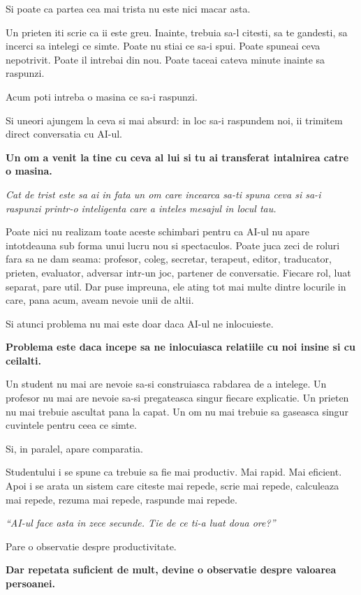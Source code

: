 Si poate ca partea cea mai trista nu este nici macar asta.

Un prieten iti scrie ca ii este greu. Inainte, trebuia sa-l citesti, sa
te gandesti, sa incerci sa intelegi ce simte. Poate nu stiai ce sa-i
spui. Poate spuneai ceva nepotrivit. Poate il intrebai din nou. Poate
taceai cateva minute inainte sa raspunzi.

Acum poti intreba o masina ce sa-i raspunzi.

Si uneori ajungem la ceva si mai absurd: in loc sa-i raspundem noi, ii
trimitem direct conversatia cu AI-ul.

\textbf{Un om a venit la tine cu ceva al lui si tu ai transferat
intalnirea catre o masina.}

\textit{Cat de trist este sa ai in fata un om care incearca sa-ti spuna
ceva si sa-i raspunzi printr-o inteligenta care a inteles mesajul in
locul tau.}

Poate nici nu realizam toate aceste schimbari pentru ca AI-ul nu apare
intotdeauna sub forma unui lucru nou si spectaculos. Poate juca zeci de
roluri fara sa ne dam seama: profesor, coleg, secretar, terapeut,
editor, traducator, prieten, evaluator, adversar intr-un joc, partener
de conversatie. Fiecare rol, luat separat, pare util. Dar puse impreuna,
ele ating tot mai multe dintre locurile in care, pana acum, aveam nevoie
unii de altii.

Si atunci problema nu mai este doar daca AI-ul ne inlocuieste.

\textbf{Problema este daca incepe sa ne inlocuiasca relatiile cu noi
insine si cu ceilalti.}

Un student nu mai are nevoie sa-si construiasca rabdarea de a intelege.
Un profesor nu mai are nevoie sa-si pregateasca singur fiecare
explicatie. Un prieten nu mai trebuie ascultat pana la capat. Un om nu
mai trebuie sa gaseasca singur cuvintele pentru ceea ce simte.

Si, in paralel, apare comparatia.

Studentului i se spune ca trebuie sa fie mai productiv. Mai rapid. Mai
eficient. Apoi i se arata un sistem care citeste mai repede, scrie mai
repede, calculeaza mai repede, rezuma mai repede, raspunde mai repede.

\textit{``AI-ul face asta in zece secunde. Tie de ce ti-a luat doua
ore?''}

Pare o observatie despre productivitate.

\textbf{Dar repetata suficient de mult, devine o observatie despre
valoarea persoanei.}

